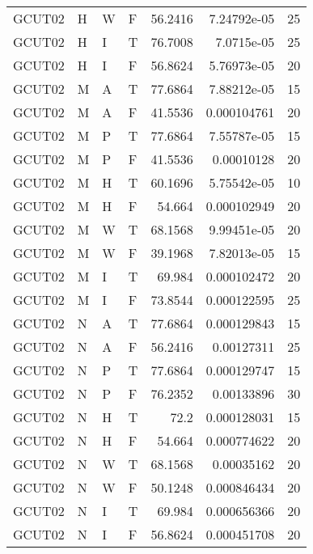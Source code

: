 \begin{table}[htb!]
{\begin{tabular}{llllrrr}
            GCUT02   & H     & W     & F          & 56.2416    & 7.24792e-05 & 25       \\
            GCUT02   & H     & I     & T          & 76.7008    & 7.0715e-05  & 25       \\
            GCUT02   & H     & I     & F          & 56.8624    & 5.76973e-05 & 20       \\
            GCUT02   & M     & A     & T          & 77.6864    & 7.88212e-05 & 15       \\
            GCUT02   & M     & A     & F          & 41.5536    & 0.000104761 & 20       \\
            GCUT02   & M     & P     & T          & 77.6864    & 7.55787e-05 & 15       \\
            GCUT02   & M     & P     & F          & 41.5536    & 0.00010128  & 20       \\
            GCUT02   & M     & H     & T          & 60.1696    & 5.75542e-05 & 10       \\
            GCUT02   & M     & H     & F          & 54.664     & 0.000102949 & 20       \\
            GCUT02   & M     & W     & T          & 68.1568    & 9.99451e-05 & 20       \\
            GCUT02   & M     & W     & F          & 39.1968    & 7.82013e-05 & 15       \\
            GCUT02   & M     & I     & T          & 69.984     & 0.000102472 & 20       \\
            GCUT02   & M     & I     & F          & 73.8544    & 0.000122595 & 25       \\
            GCUT02   & N     & A     & T          & 77.6864    & 0.000129843 & 15       \\
            GCUT02   & N     & A     & F          & 56.2416    & 0.00127311  & 25       \\
            GCUT02   & N     & P     & T          & 77.6864    & 0.000129747 & 15       \\
            GCUT02   & N     & P     & F          & 76.2352    & 0.00133896  & 30       \\
            GCUT02   & N     & H     & T          & 72.2       & 0.000128031 & 15       \\
            GCUT02   & N     & H     & F          & 54.664     & 0.000774622 & 20       \\
            GCUT02   & N     & W     & T          & 68.1568    & 0.00035162  & 20       \\
            GCUT02   & N     & W     & F          & 50.1248    & 0.000846434 & 20       \\
            GCUT02   & N     & I     & T          & 69.984     & 0.000656366 & 20       \\
            GCUT02   & N     & I     & F          & 56.8624    & 0.000451708 & 20       \\
            \hline
        \end{tabular}
    }{
    }
\end{table} 
